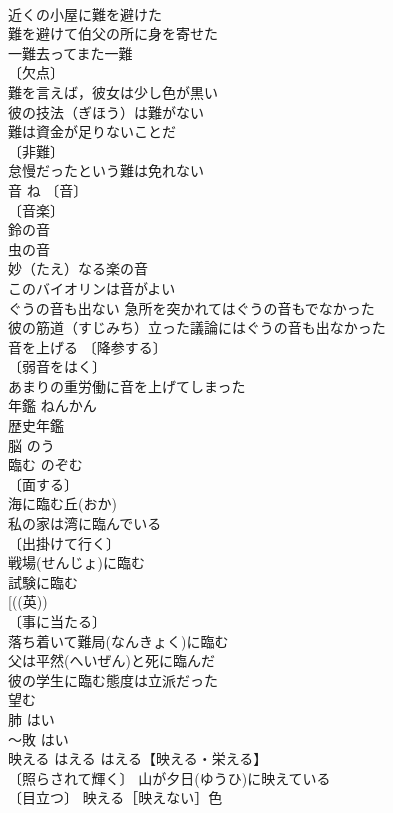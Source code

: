 \documentclass[8pt]{extreport}
\begin{document}
\begin{CJK}{UTF8}{min}
\\	近くの小屋に難を避けた 
\\	難を避けて伯父の所に身を寄せた 
\\	一難去ってまた一難 
\\	〔欠点〕
\\	難を言えば，彼女は少し色が黒い 
\\	彼の技法（ぎほう）は難がない 
\\	難は資金が足りないことだ 
\\	〔非難〕
\\	怠慢だったという難は免れない 
\\	音	ね	〔音〕
\\	〔音楽〕
\\	鈴の音 
\\	虫の音 
\\	妙（たえ）なる楽の音 
\\	このバイオリンは音がよい 
\\	ぐうの音も出ない 急所を突かれてはぐうの音もでなかった 
\\	彼の筋道（すじみち）立った議論にはぐうの音も出なかった 
\\	音を上げる 〔降参する〕
\\	〔弱音をはく〕
\\	あまりの重労働に音を上げてしまった 
\\	年鑑	ねんかん	
\\	歴史年鑑 
\\	脳	のう	
\\	臨む	のぞむ	
\\	〔面する〕 
\\	海に臨む丘(おか) 
\\	私の家は湾に臨んでいる 
\\	〔出掛けて行く〕 
\\	戦場(せんじょ)に臨む 
\\	試験に臨む 
\\	[((英))
\\	〔事に当たる〕 
\\	落ち着いて難局(なんきょく)に臨む 
\\	父は平然(へいぜん)と死に臨んだ 
\\	彼の学生に臨む態度は立派だった 
\\	望む 
\\	肺	はい	
\\	～敗	はい	
\\	映える	はえる	はえる【映える・栄える】 
\\	〔照らされて輝く〕 山が夕日(ゆうひ)に映えている 
\\	〔目立つ〕 映える［映えない］色 

\end{CJK}
\end{document}
